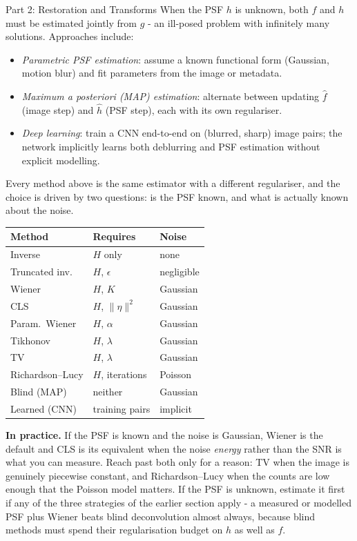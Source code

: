 \documentclass[letterpaper]{article}
\begin{document}
\begin{notes}{Part 2: Restoration and Transforms}
When the PSF $h$ is unknown, both $f$ and $h$ must be estimated jointly from $g$ - an ill-posed problem with infinitely many solutions. Approaches include:
\begin{itemize}
    \item \textit{Parametric PSF estimation}: assume a known functional form (Gaussian, motion blur) and fit parameters from the image or metadata.
    \item \textit{Maximum a posteriori (MAP) estimation}: alternate between updating $\hat{f}$ (image step) and $\hat{h}$ (PSF step), each with its own regulariser.
    \item \textit{Deep learning}: train a CNN end-to-end on (blurred, sharp) image pairs; the network implicitly learns both deblurring and PSF estimation without explicit modelling.
\end{itemize}


Every method above is the same estimator with a different regulariser, and the choice is driven by two questions: is the PSF known, and what is actually known about the noise.

\begin{center}
\begin{tabular}{@{}lll@{}}
\toprule
Method & Requires & Noise \\
\midrule
Inverse        & $H$ only          & none \\
Truncated inv. & $H$, $\epsilon$   & negligible \\
Wiener         & $H$, $K$          & Gaussian \\
CLS            & $H$, $\|\eta\|^2$ & Gaussian \\
Param.\ Wiener & $H$, $\alpha$     & Gaussian \\
Tikhonov       & $H$, $\lambda$    & Gaussian \\
TV             & $H$, $\lambda$    & Gaussian \\
Richardson--Lucy & $H$, iterations & Poisson \\
Blind (MAP)    & neither           & Gaussian \\
Learned (CNN)  & training pairs    & implicit \\
\bottomrule
\end{tabular}
\end{center}

\textbf{In practice.} If the PSF is known and the noise is Gaussian, Wiener is the default and CLS is its equivalent when the noise \emph{energy} rather than the SNR is what you can measure. Reach past both only for a reason: TV when the image is genuinely piecewise constant, and Richardson--Lucy when the counts are low enough that the Poisson model matters. If the PSF is unknown, estimate it first if any of the three strategies of the earlier section apply - a measured or modelled PSF plus Wiener beats blind deconvolution almost always, because blind methods must spend their regularisation budget on $h$ as well as $f$.


\end{notes}
\end{document}
